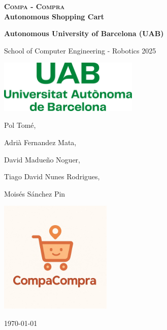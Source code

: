 \documentclass[a4paper,12pt]{article}
\begin{document}
\begin{titlepage}
    \centering
    \vspace*{2cm}

    {\Huge\bfseries \textsc{Compa - Compra} \\ Autonomous Shopping Cart \par}

    \vspace{1.5cm}
    {\Large\bfseries Autonomous University of Barcelona (UAB)

    School of Computer Engineering - Robotics 2025 \par}

    \vspace{0.5cm}

    \includegraphics[width=0.5\textwidth]{Logo_uab.png} %

    \vspace{0.5cm}
    {\large Pol Tomé,

    Adrià Fernandez Mata,

    David Madueño Noguer,

    Tiago David Nunes Rodrigues,

    Moisés Sánchez Pin
     \par}

    \vspace{2cm}
    \includegraphics[width=0.4\textwidth]{compacompra_logo.jpg} %

    \vfill
    {\Large \today} %

\end{titlepage}
\end{document}
